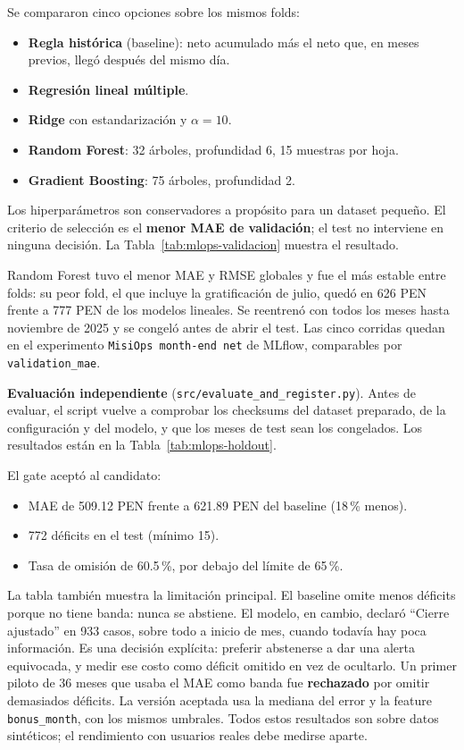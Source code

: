 Se compararon cinco opciones sobre los mismos folds:
\begin{itemize}
    \item \textbf{Regla histórica} (baseline): neto acumulado más el neto que, en meses previos, llegó después del mismo día.
    \item \textbf{Regresión lineal múltiple}.
    \item \textbf{Ridge} con estandarización y $\alpha = 10$.
    \item \textbf{Random Forest}: 32 árboles, profundidad 6, 15 muestras por hoja.
    \item \textbf{Gradient Boosting}: 75 árboles, profundidad 2.
\end{itemize}

Los hiperparámetros son conservadores a propósito para un dataset pequeño. El criterio de selección es el \textbf{menor MAE de validación}; el test no interviene en ninguna decisión. La Tabla~\ref{tab:mlops-validacion} muestra el resultado.



Random Forest tuvo el menor MAE y RMSE globales y fue el más estable entre folds: su peor fold, el que incluye la gratificación de julio, quedó en 626 PEN frente a 777 PEN de los modelos lineales. Se reentrenó con todos los meses hasta noviembre de 2025 y se congeló antes de abrir el test. Las cinco corridas quedan en el experimento \texttt{MisiOps month-end net} de MLflow, comparables por \texttt{validation\_mae}.

\textbf{Evaluación independiente} (\texttt{src/evaluate\_and\_register.py}). Antes de evaluar, el script vuelve a comprobar los checksums del dataset preparado, de la configuración y del modelo, y que los meses de test sean los congelados. Los resultados están en la Tabla~\ref{tab:mlops-holdout}.



El gate aceptó al candidato:
\begin{itemize}
    \item MAE de 509.12 PEN frente a 621.89 PEN del baseline (18\,\% menos).
    \item 772 déficits en el test (mínimo 15).
    \item Tasa de omisión de 60.5\,\%, por debajo del límite de 65\,\%.
\end{itemize}

La tabla también muestra la limitación principal. El baseline omite menos déficits porque no tiene banda: nunca se abstiene. El modelo, en cambio, declaró ``Cierre ajustado'' en 933 casos, sobre todo a inicio de mes, cuando todavía hay poca información. Es una decisión explícita: preferir abstenerse a dar una alerta equivocada, y medir ese costo como déficit omitido en vez de ocultarlo. Un primer piloto de 36 meses que usaba el MAE como banda fue \textbf{rechazado} por omitir demasiados déficits. La versión aceptada usa la mediana del error y la feature \texttt{bonus\_month}, con los mismos umbrales. Todos estos resultados son sobre datos sintéticos; el rendimiento con usuarios reales debe medirse aparte.


